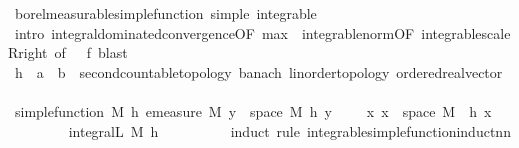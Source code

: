 \begin{isabellebody}
\ borel{\isacharunderscore}{\kern0pt}measurable{\isacharunderscore}{\kern0pt}simple{\isacharunderscore}{\kern0pt}function\ simple\ integrable\ \isamarkupfalse%
\ {\isacharparenleft}{\kern0pt}intro\ integral{\isacharunderscore}{\kern0pt}dominated{\isacharunderscore}{\kern0pt}convergence{\isacharbrackleft}{\kern0pt}OF\ max{\isacharparenleft}{\kern0pt}{}{\isacharparenright}{\kern0pt}\ {\isacharunderscore}{\kern0pt}\ integrable{\isacharunderscore}{\kern0pt}norm{\isacharbrackleft}{\kern0pt}OF\ integrable{\isacharunderscore}{\kern0pt}scaleR{\isacharunderscore}{\kern0pt}right{\isacharbrackright}{\kern0pt}{\isacharcomma}{\kern0pt}\ of\ {\isacharunderscore}{\kern0pt}\ {}\ f{\isacharbrackright}{\kern0pt}{\isacharcomma}{\kern0pt}\ blast{\isacharplus}{\kern0pt}{\isacharparenright}{\kern0pt}\isanewline
\ \ \ \ \isacommand{{\isacharbraceleft}{\kern0pt}}\isamarkupfalse%
\isanewline
\ \ \ \ \ \ \isamarkupfalse%
\ h\ {\isacharcolon}{\kern0pt}{\isacharcolon}{\kern0pt}\ {\isachardoublequoteopen}{\isacharprime}{\kern0pt}a\ {\isasymRightarrow}\ {\isacharprime}{\kern0pt}b\ {\isacharcolon}{\kern0pt}{\isacharcolon}{\kern0pt}\ {\isacharbraceleft}{\kern0pt}second{\isacharunderscore}{\kern0pt}countable{\isacharunderscore}{\kern0pt}topology{\isacharcomma}{\kern0pt}\ banach{\isacharcomma}{\kern0pt}\ linorder{\isacharunderscore}{\kern0pt}topology{\isacharcomma}{\kern0pt}\ ordered{\isacharunderscore}{\kern0pt}real{\isacharunderscore}{\kern0pt}vector{\isacharbraceright}{\kern0pt}{\isachardoublequoteclose}\ \isanewline
\ \ \ \ \ \ \isamarkupfalse%
\ {\isachardoublequoteopen}simple{\isacharunderscore}{\kern0pt}function\ M\ h{\isachardoublequoteclose}\ {\isachardoublequoteopen}emeasure\ M\ {\isacharbraceleft}{\kern0pt}y\ {\isasymin}\ space\ M{\isachardot}{\kern0pt}\ h\ y\ {\isasymnoteq}\ {}{\isacharbraceright}{\kern0pt}\ {\isasymnoteq}\ {\isasyminfinity}{\isachardoublequoteclose}\ {\isachardoublequoteopen}{\isasymAnd}x{\isachardot}{\kern0pt}\ x\ {\isasymin}\ space\ M\ {\isasymlongrightarrow}\ h\ x\ {\isasymge}\ {}{\isachardoublequoteclose}\isanewline
\ \ \ \ \ \ \isamarkupfalse%
\ {\isacharasterisk}{\kern0pt}{\isacharcolon}{\kern0pt}\ {\isachardoublequoteopen}integral\isactrlsup L\ M\ h\ {\isasymge}\ {}{\isachardoublequoteclose}\isanewline
\ \ \ \ \ \ \isamarkupfalse%
\ {\isacharparenleft}{\kern0pt}induct\ rule{\isacharcolon}{\kern0pt}\ integrable{\isacharunderscore}{\kern0pt}simple{\isacharunderscore}{\kern0pt}function{\isacharunderscore}{\kern0pt}induct{\isacharunderscore}{\kern0pt}nn{\isacharparenright}{\kern0pt}\isanewline

\end{isabellebody}
